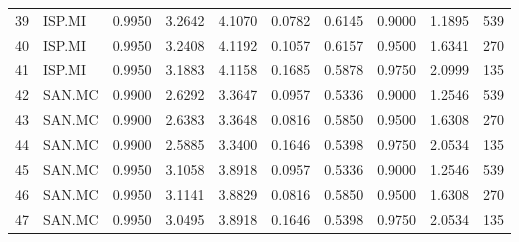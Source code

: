 \begin{table}
\begin{tabular}{llrrrrrrrr}
39 & ISP.MI & 0.9950 & 3.2642 & 4.1070 & 0.0782 & 0.6145 & 0.9000 & 1.1895 & 539 \\
40 & ISP.MI & 0.9950 & 3.2408 & 4.1192 & 0.1057 & 0.6157 & 0.9500 & 1.6341 & 270 \\
41 & ISP.MI & 0.9950 & 3.1883 & 4.1158 & 0.1685 & 0.5878 & 0.9750 & 2.0999 & 135 \\
42 & SAN.MC & 0.9900 & 2.6292 & 3.3647 & 0.0957 & 0.5336 & 0.9000 & 1.2546 & 539 \\
43 & SAN.MC & 0.9900 & 2.6383 & 3.3648 & 0.0816 & 0.5850 & 0.9500 & 1.6308 & 270 \\
44 & SAN.MC & 0.9900 & 2.5885 & 3.3400 & 0.1646 & 0.5398 & 0.9750 & 2.0534 & 135 \\
45 & SAN.MC & 0.9950 & 3.1058 & 3.8918 & 0.0957 & 0.5336 & 0.9000 & 1.2546 & 539 \\
46 & SAN.MC & 0.9950 & 3.1141 & 3.8829 & 0.0816 & 0.5850 & 0.9500 & 1.6308 & 270 \\
47 & SAN.MC & 0.9950 & 3.0495 & 3.8918 & 0.1646 & 0.5398 & 0.9750 & 2.0534 & 135 \\
\bottomrule
\end{tabular}
\end{table}
